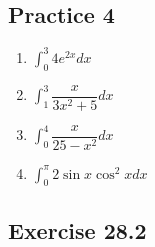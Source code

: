 \documentclass{report}
\begin{document}
\subsection{Practice 4}

\begin{enumerate}
    \item $\displaystyle\int_0^3 4 e^{2 x} d x$
    \item $\displaystyle\int_1^3 \dfrac{x}{3 x^2+5} d x$
    \item $\displaystyle\int_0^4 \dfrac{x}{25-x^2} d x$
    \item $\displaystyle\int_0^\pi 2 \sin x \cos ^2 x d x$
\end{enumerate}

\subsection{Exercise 28.2}
\end{document}
